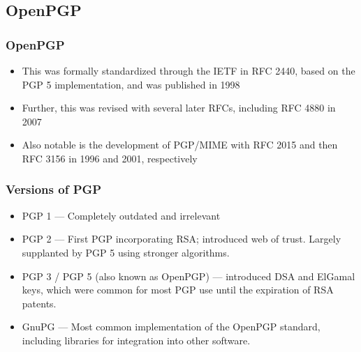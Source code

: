 \documentclass[aspectratio=1610,bigger,utf8]{beamer}
\begin{document}
\subsection{OpenPGP}
\begin{frame}
	\frametitle{OpenPGP}
	\begin{itemize}
		\item This was formally standardized through the IETF in
			\alert{RFC 2440}, based on the PGP 5 implementation,
			and was published in 1998
		\item Further, this was revised with several later RFCs,
			including \alert{RFC 4880} in 2007
		\item Also notable is the development of PGP/MIME with
			\alert{RFC 2015} and then \alert{RFC 3156} in 1996 and
			2001, respectively
	\end{itemize}
\end{frame}
\begin{frame}
	\frametitle{Versions of PGP}
	\begin{itemize}
		\item PGP 1 --- Completely outdated and irrelevant
		\item PGP 2 --- First PGP incorporating RSA; introduced web of
			trust. Largely supplanted by PGP 5 using stronger
			algorithms.
		\item PGP 3 / PGP 5 (also known as OpenPGP) --- introduced DSA
			and ElGamal keys, which were common for most PGP use
			until the expiration of RSA patents.
		\item GnuPG --- Most common implementation of the OpenPGP
			standard, including libraries for integration into
			other software.
	\end{itemize}
\end{frame}
\end{document}
